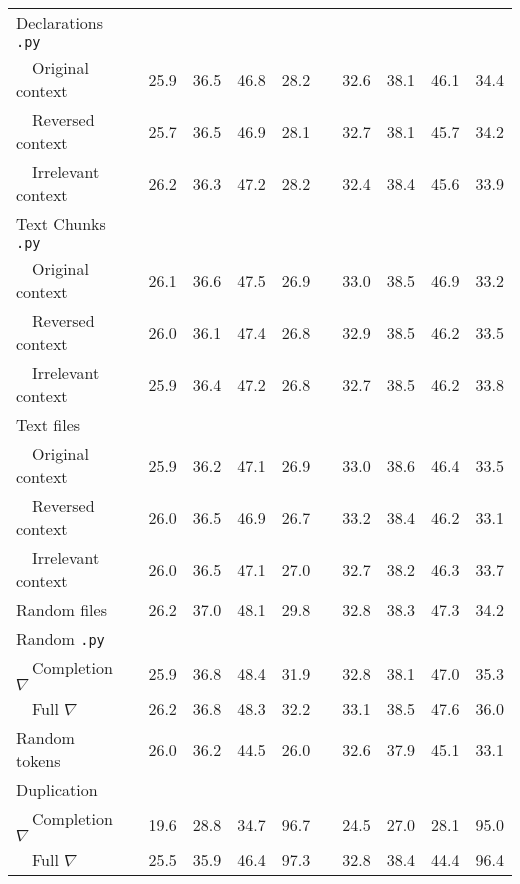 \begin{table}[H]
{\begin{tabular}{lc cc>{\columncolor{gray!30}}cc c cc>{\columncolor{gray!30}}cc}
    \midrule
    Declarations \texttt{.py} & & & & & & & & & & \\
    ~~Original context & & 25.9 & 36.5 & 46.8 & 28.2 & & 32.6 & 38.1 & 46.1 & 34.4 \\
    ~~Reversed context & & 25.7 & 36.5 & 46.9 & 28.1 & & 32.7 & 38.1 & 45.7 & 34.2 \\
    ~~Irrelevant context & & 26.2 & 36.3 & 47.2 & 28.2 & & 32.4 & 38.4 & 45.6 & 33.9 \\
    
    \midrule
    Text Chunks \texttt{.py} & & & & & & & & & & \\
    ~~Original context & & 26.1 & 36.6 & 47.5 & 26.9 & & 33.0 & 38.5 & 46.9 & 33.2 \\
    ~~Reversed context & & 26.0 & 36.1 & 47.4 & 26.8 & & 32.9 & 38.5 & 46.2 & 33.5 \\
    ~~Irrelevant context & & 25.9 & 36.4 & 47.2 & 26.8 & & 32.7 & 38.5 & 46.2 & 33.8 \\
    
    \midrule
    Text files & & & & & & & & & & \\
    ~~Original context & & 25.9 & 36.2 & 47.1 & 26.9 & & 33.0 & 38.6 & 46.4 & 33.5 \\
    ~~Reversed context & & 26.0 & 36.5 & 46.9 & 26.7 & & 33.2 & 38.4 & 46.2 & 33.1 \\
    ~~Irrelevant context & & 26.0 & 36.5 & 47.1 & 27.0 & & 32.7 & 38.2 & 46.3 & 33.7 \\
    
    \midrule
    Random files & & 26.2 & 37.0 & 48.1 & 29.8 & & 32.8 & 38.3 & 47.3 & 34.2 \\
    
    \midrule
    Random \texttt{.py} & & & & & & & & & & \\
    ~~Completion $\nabla$ & & 25.9 & 36.8 & 48.4 & 31.9 & & 32.8 & 38.1 & 47.0 & 35.3 \\
    ~~Full $\nabla$ & & 26.2 & 36.8 & 48.3 & 32.2 & & 33.1 & 38.5 & 47.6 & 36.0 \\
    
    \midrule
    Random tokens & & 26.0 & 36.2 & 44.5 & 26.0 & & 32.6 & 37.9 & 45.1 & 33.1 \\
    
    \midrule
    Duplication & & & & & & & & & & \\
    ~~Completion $\nabla$ & & 19.6 & 28.8 & 34.7 & 96.7 & & 24.5 & 27.0 & 28.1 & 95.0 \\
    ~~Full $\nabla$ & & 25.5 & 35.9 & 46.4 & 97.3 & & 32.8 & 38.4 & 44.4 & 96.4 \\
    

\end{tabular}}
\end{table}
